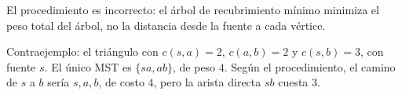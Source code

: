 \ejercicio{}

El procedimiento es incorrecto: el árbol de recubrimiento mínimo minimiza el peso total del árbol, no la distancia desde la fuente a cada vértice.

Contraejemplo: el triángulo con $c(s, a) = 2$, $c(a, b) = 2$ y $c(s, b) = 3$, con fuente $s$. El único MST es $\{sa, ab\}$, de peso $4$. Según el procedimiento, el camino de $s$ a $b$ sería $s, a, b$, de costo $4$, pero la arista directa $sb$ cuesta $3$.
